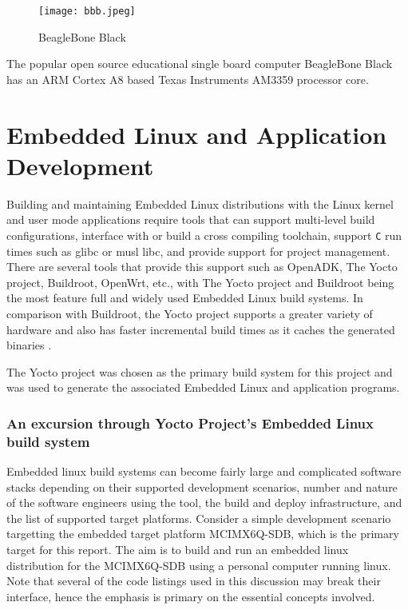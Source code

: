 \begin{figure}[h]
	\centering
	\texttt{[image: bbb.jpeg]}
	\caption{BeagleBone Black}
	\label{fig:bbb}
\end{figure}

The popular open source educational single board computer BeagleBone Black has an ARM Cortex A8 based Texas Instruments AM3359 processor core.


\section{Embedded Linux and Application Development}

Building and maintaining Embedded Linux distributions with the Linux kernel and user mode applications require tools that can support multi-level build configurations, interface with or build a cross compiling toolchain, support \texttt{C} run times such as glibc or musl libc, and provide support for project management. There are several tools that provide this support such as OpenADK, The Yocto project, Buildroot, OpenWrt, etc., with The Yocto project and Buildroot being the most feature full and widely used Embedded Linux build systems. In comparison with Buildroot, the Yocto project supports a greater variety of hardware and also has faster incremental build times as it caches the generated binaries \cite{yocto}.

The Yocto project was chosen as the primary build system for this project and was used to generate the associated Embedded Linux and application programs.

\subsubsection{An excursion through Yocto Project's Embedded Linux build system}
\label{section:yocto-demo}

Embedded linux build systems can become fairly large and complicated software stacks depending on their supported development scenarios, number and nature of the software engineers using the tool, the build and deploy infrastructure, and the list of supported target platforms. Consider a simple development scenario targetting the embedded target platform MCIMX6Q-SDB, which is the primary target for this report. The aim is to build and run an embedded linux distribution for the MCIMX6Q-SDB using a personal computer running linux. Note that several of the code listings used in this discussion may break their interface, hence the emphasis is primary on the essential concepts involved.

